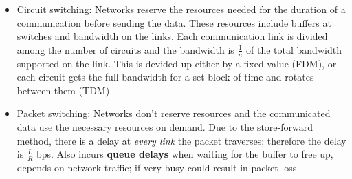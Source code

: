 \documentclass[12pt]{report}
\begin{document}
\begin{itemize}
  \item Circuit switching: Networks reserve the resources needed for the duration of a communication before sending the data. These resources include buffers at switches and bandwidth on the links. Each communication link is divided among the number of circuits and the bandwidth is \textbf{$\frac{1}{n}$} of the total bandwidth supported on the link. This is devided up either by a fixed value (FDM), or each circuit gets the full bandwidth for a set block of time and rotates between them (TDM)
        \item Packet switching: Networks don't reserve resources and the communicated data use the necessary resources on demand. Due to the store-forward method, there is a delay at \textit{every link} the packet traverses; therefore the delay is $\frac{L}{R}$ bps. Also incurs \textbf{queue delays} when waiting for the buffer to free up, depends on network traffic; if very busy could result in packet loss
\end{itemize}
\end{document}
